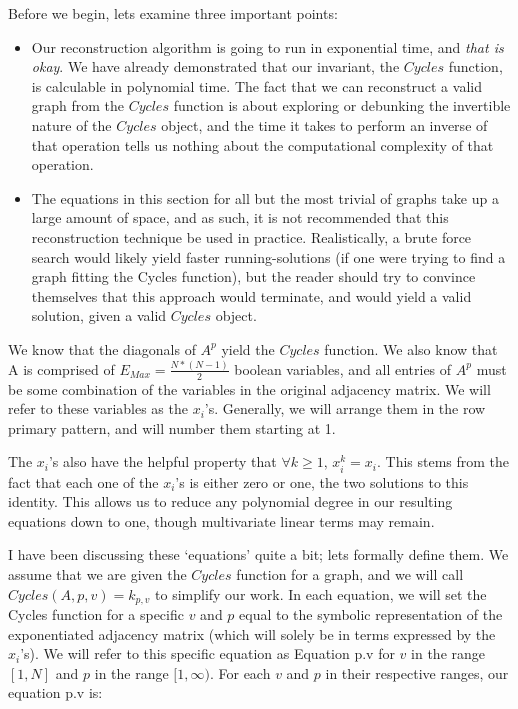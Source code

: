 Before we begin, lets examine three important points:
\begin{itemize}
  \item{
  	Our reconstruction algorithm is going to run in exponential time, and \emph{that is okay}.  
  	We have already demonstrated that our invariant, the $Cycles$ function, is calculable in polynomial time.  
  	The fact that we can reconstruct a valid graph from the $Cycles$ function is about exploring or debunking the invertible nature of the $Cycles$ object, 
  	and the time it takes to perform an inverse of that operation tells us nothing about the computational complexity of that operation.
  }
  \item{
  	The equations in this section for all but the most trivial of graphs take up a large amount of space, and as such, it is not recommended that this reconstruction technique be used in practice.  
  	Realistically, a brute force search would likely yield faster running-solutions (if one were trying to find a graph fitting the Cycles function), but the reader should try to convince themselves that this approach would terminate, 
  	and would yield a valid solution, given a valid $Cycles$ object.
  }
\end{itemize}

We know that the diagonals of $A^p$ yield the $Cycles$ function.
We also know that A is comprised of $E_{Max} = \frac{N * (N - 1)}{2}$ boolean variables, and all entries of $A^p$ must be some combination of the variables in the original adjacency matrix. 
We will refer to these variables as the $x_i$'s. Generally, we will arrange them in the row primary pattern, and will number them starting at 1.

The $x_i$'s also have the helpful property that $\forall k \geq 1,\, x_i^k = x_i $. 
This stems from the fact that each one of the $x_i$'s is either zero or one, the two solutions to this identity.  
This allows us to reduce any polynomial degree in our resulting equations down to one, though multivariate linear terms may remain.

I have been discussing these `equations' quite a bit; lets formally define them.  
We assume that we are given the $Cycles$ function for a graph, and we will call $Cycles(A, p, v) = k_{p, v}$ to simplify our work. 
In each equation, we will set the Cycles function for a specific $v$ and $p$ equal to the symbolic representation of the exponentiated adjacency matrix (which will solely be in terms expressed by the $x_i$'s).
We will refer to this specific equation as Equation p.v for $v$ in the range $[1, N]$ and $p$ in the range $[1, \infty)$.
For each $v$ and $p$ in their respective ranges, our equation p.v is:

